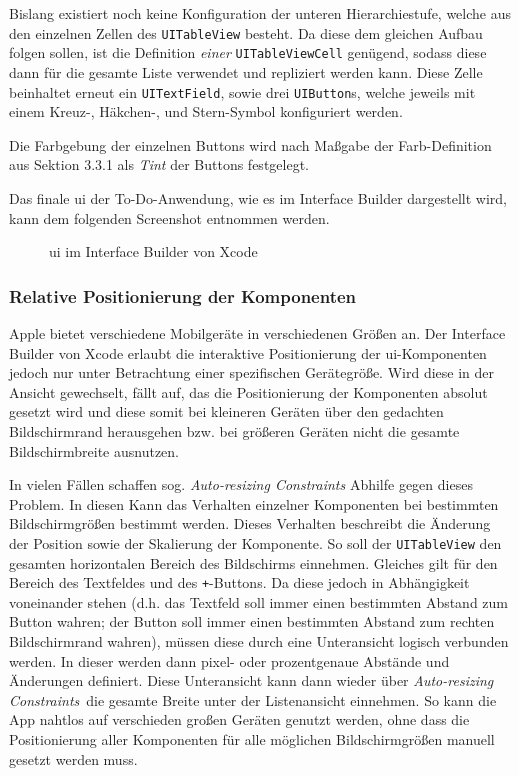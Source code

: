 Bislang existiert noch keine Konfiguration der unteren Hierarchiestufe, welche aus den einzelnen Zellen des \texttt{UITableView} besteht. Da diese dem gleichen Aufbau folgen sollen, ist die Definition \textit{einer} \texttt{UITableViewCell} genügend, sodass diese dann für die gesamte Liste verwendet und repliziert werden kann. Diese Zelle beinhaltet erneut ein \texttt{UITextField}, sowie drei \texttt{UIButton}s, welche jeweils mit einem Kreuz-, Häkchen-, und Stern-Symbol konfiguriert werden.

Die Farbgebung der einzelnen Buttons wird nach Maßgabe der Farb-Definition aus Sektion 3.3.1 als \textit{Tint} der Buttons festgelegt.

Das finale \ac{ui} der To-Do-Anwendung, wie es im Interface Builder dargestellt wird, kann dem folgenden Screenshot entnommen werden.

\begin{figure}[h!]
	\centering
	\caption{\ac{ui} im Interface Builder von Xcode}
\end{figure}

\subsubsection{Relative Positionierung der Komponenten}
Apple bietet verschiedene Mobilgeräte in verschiedenen Größen an. Der Interface Builder von Xcode erlaubt die interaktive Positionierung der \ac{ui}-Komponenten jedoch nur unter Betrachtung einer spezifischen Gerätegröße. Wird diese in der Ansicht gewechselt, fällt auf, das die Positionierung der Komponenten absolut gesetzt wird und diese somit bei kleineren Geräten über den gedachten Bildschirmrand herausgehen bzw. bei größeren Geräten nicht die gesamte Bildschirmbreite ausnutzen.

In vielen Fällen schaffen sog. \textit{Auto-resizing Constraints} Abhilfe gegen dieses Problem. In diesen Kann das Verhalten einzelner Komponenten bei bestimmten Bildschirmgrößen bestimmt werden. Dieses Verhalten beschreibt die Änderung der Position sowie der Skalierung der Komponente. So soll der \texttt{UITableView} den gesamten horizontalen Bereich des Bildschirms einnehmen. Gleiches gilt für den Bereich des Textfeldes und des \texttt{+}-Buttons. Da diese jedoch in Abhängigkeit voneinander stehen (d.h. das Textfeld soll immer einen bestimmten Abstand zum Button wahren; der Button soll immer einen bestimmten Abstand zum rechten Bildschirmrand wahren), müssen diese durch eine Unteransicht logisch verbunden werden. In dieser werden dann pixel- oder prozentgenaue Abstände und Änderungen definiert. Diese Unteransicht kann dann wieder über \textit{Auto-resizing Constraints} die gesamte Breite unter der Listenansicht einnehmen. So kann die App nahtlos auf verschieden großen Geräten genutzt werden, ohne dass die Positionierung aller Komponenten für alle möglichen Bildschirmgrößen manuell gesetzt werden muss.

